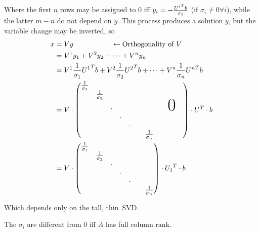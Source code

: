 \documentclass[computational_mathematics.tex]{subfiles}
\begin{document}
Where the first $n$ rows may be assigned to $0$ iff $y_{i} = -\frac{{U^{i}}^{T} b}{\sigma_{1}}$ (if $\sigma_i \neq 0 \forall i$), while the latter $m-n$ do not depend on $y$. This process produces a solution $y$, but the variable change may be inverted, so 
\begin{equation}
  \begin{aligned}
    x &= Vy ~~~~~~~~~~~~~~~~ \leftarrow \text{Orthogonality of} ~V\\
    &= V^1 y_1 + V^2 y_2+ \cdots + V^n y_n\\
    &= V^1 \frac{1}{\sigma_1} \tr{U^1} b + V^2 \frac{1}{\sigma_2} \tr{U^2} b + \cdots + V^n \frac{1}{\sigma_n} \tr{U^n} b\\ 
    &= {V \cdot \begin{pmatrix}
      \frac{1}{\sigma_{1}} & & & & &&&&\\
        & \frac{1}{\sigma_{2}} & & & &&&&\\
        & & \cdot & & & &&&\text{\Huge 0}\\
        & & & \cdot & &&&&\\
        & & & & \cdot &&&&&\\
        & & & & & & \frac{1}{\sigma_{n}}&&&\\
    \end{pmatrix} \cdot \tr{U} \cdot b}\\
    &= {V \cdot \begin{pmatrix}
      \frac{1}{\sigma_{1}} & & & &\\
        & \frac{1}{\sigma_{2}} & & &\\
        & & \cdot & & &\\
        & & & \cdot & &\\
        & & & & \cdot &\\
        & & & & & & \frac{1}{\sigma_{n}}\\
    \end{pmatrix} \cdot \tr{U_1} \cdot b}\\
  \end{aligned}
\end{equation}

Which depends only on the tall, thin~SVD.%
\begin{proposition}
  The $\sigma_{i}$ are different from $0$ iff $A$ has full column rank.
\end{proposition}
\end{document}
